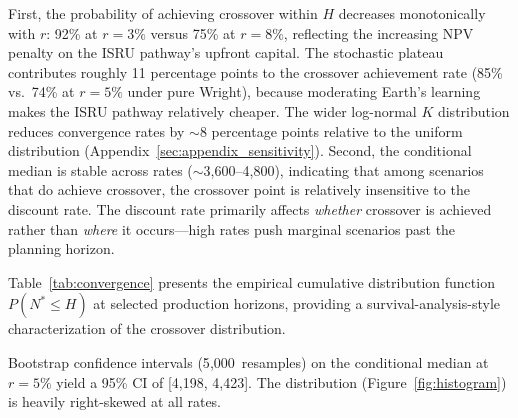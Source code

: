 \documentclass[5p,twocolumn]{elsarticle}
\begin{document}
First, the probability of achieving crossover within $H$ decreases monotonically with $r$: 92\% at $r = 3\%$ versus 75\% at $r = 8\%$, reflecting the increasing NPV penalty on the ISRU pathway's upfront capital. The stochastic plateau contributes roughly 11 percentage points to the crossover achievement rate (85\% vs.\ 74\% at $r = 5\%$ under pure Wright), because moderating Earth's learning makes the ISRU pathway relatively cheaper. The wider log-normal $K$ distribution reduces convergence rates by $\sim$8 percentage points relative to the uniform distribution (Appendix~\ref{sec:appendix_sensitivity}). Second, the conditional median is stable across rates ($\sim$3{,}600--4{,}800), indicating that among scenarios that do achieve crossover, the crossover point is relatively insensitive to the discount rate. The discount rate primarily affects \emph{whether} crossover is achieved rather than \emph{where} it occurs---high rates push marginal scenarios past the planning horizon.

Table~\ref{tab:convergence} presents the empirical cumulative distribution function $P(N^* \leq H)$ at selected production horizons, providing a survival-analysis-style characterization of the crossover distribution.

\begin{table}[htbp]
\centering
\caption{Probability of achieving crossover at or below production horizon $H$, $P(N^* \leq H)$.}
\label{tab:convergence}
\small
{}
\end{table}

Bootstrap confidence intervals (5{,}000~resamples) on the conditional median at $r = 5\%$ yield a 95\% CI of [4{,}198, 4{,}423]. The distribution (Figure~\ref{fig:histogram}) is heavily right-skewed at all rates.
\end{document}
